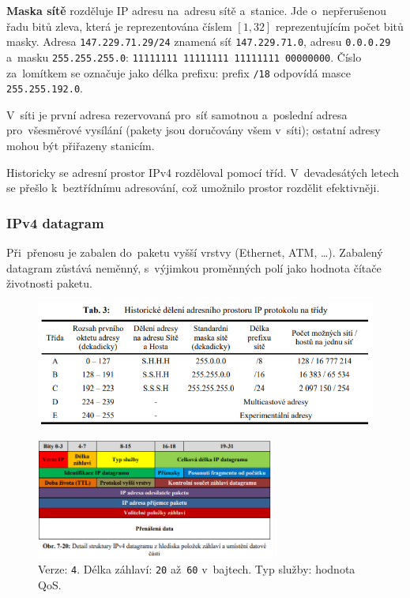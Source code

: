 \textbf{Maska sítě} rozděluje IP adresu na~adresu sítě a~stanice. Jde o~nepřerušenou řadu bitů zleva, která je reprezentována číslem $[1, 32]$ reprezentujícím počet bitů masky. Adresa \texttt{147.229.71.29/24} znamená síť \texttt{147.229.71.0}, adresu \texttt{0.0.0.29} a~masku \texttt{255.255.255.0}: \texttt{11111111 11111111 11111111 00000000}. Číslo za~lomítkem se označuje jako délka prefixu: prefix \texttt{/18} odpovídá masce \texttt{255.255.192.0}.

V~síti je první adresa rezervovaná pro~síť samotnou a~poslední adresa pro~všesměrové vysílání (pakety jsou doručovány všem v~síti); ostatní adresy mohou být přiřazeny stanicím.

Historicky se adresní prostor IPv4 rozděloval pomocí tříd. V~devadesátých letech se přešlo k~beztřídnímu adresování, což umožnilo prostor rozdělit efektivněji.



\subsubsection{IPv4 datagram}

Při~přenosu je zabalen do~paketu vyšší vrstvy (Ethernet, ATM, \dots). Zabalený datagram zůstává neměnný, s~výjimkou proměnných polí jako hodnota čítače životnosti paketu.

\clearpage
\begin{figure}
	\centering
	\includegraphics[width=\textwidth]{images/q07_ip_classes}
\end{figure}

\begin{figure}
	\centering
	\includegraphics[width=0.7\textwidth]{images/q07_ip_packet}
	\caption*{Verze: \texttt{4}. Délka záhlaví: \texttt{20} až~\texttt{60} v~bajtech. Typ služby: hodnota QoS. }
\end{figure}

